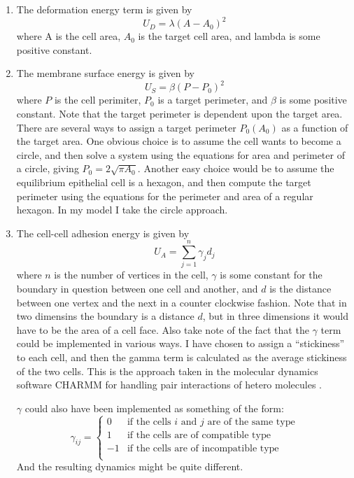 \begin{enumerate}
\item The deformation energy term is given by \\ 
\begin{equation}
U_D = \lambda(A - A_0)^2
\end{equation}
 where A is the cell area, $A_0$ is the target cell area, and lambda is some positive constant.
\item The membrane surface energy is given by
\begin{equation}
U_S = \beta(P - P_0)^2
\end{equation}
 where $P$ is the cell perimiter, $P_0$ is a target perimeter, and $\beta$ is some positive constant. Note that the target perimeter is dependent upon the target area. There are several ways to assign a target perimeter $P_0(A_0)$ as a function of the target area. One obvious choice is to assume the cell wants to become a circle, and then solve a system using the equations for area and perimeter of a circle, giving $P_0 =2\sqrt{\pi A_0}$. Another easy choice would be to assume the equilibrium epithelial cell is a hexagon, and then compute the target perimeter using the equations for the perimeter and area of a regular hexagon. In my model I take the circle approach.
\item The cell-cell adhesion energy is given by
\begin{equation}U_A = \displaystyle\sum\limits_{j = 1}^{n}\gamma_{j}d_{j}\end{equation}
where $n$ is the number of vertices in the cell, $\gamma$ is some constant for the boundary in question between one cell and another, and $d$ is the distance between one vertex and the next in a counter clockwise fashion. Note that in two dimensins the boundary is a distance $d$, but in three dimensions it would have to be the area of a cell face. Also take note of the fact that the $\gamma$ term could be implemented in various ways. I have chosen to assign a ``stickiness'' to each cell, and then the gamma term is calculated as the average stickiness of the two cells. This is the approach taken in the molecular dynamics software CHARMM for handling pair interactions of hetero molecules \cite{CHARMM}.

 $\gamma$ could also have been implemented as something of the form:
\[  \gamma_{ij} =  \left\{
\begin{array}{ll}
      0 & \textrm{if the cells $i$ and $j$ are of the same type} \\
      1 &  \textrm{if the cells are of compatible type}\\
      -1 & \textrm{if the cells are of incompatible type} \\
\end{array} 
\right. \]
And the resulting dynamics might be quite different.
\end{enumerate}

